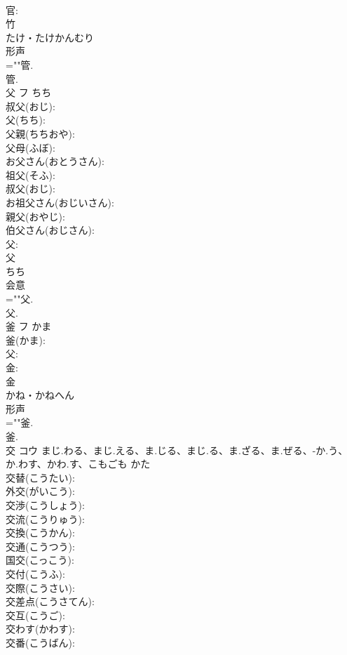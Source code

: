 \documentclass[8pt]{extreport}
\begin{document}
\begin{CJK}{UTF8}{min}
\\	官: 
\\	竹	
\\	たけ・たけかんむり	
\\	形声 
\\	=""管.
\\	管.
\\	父	フ	ちち		
\\	叔父(おじ): 
\\	父(ちち): 
\\	父親(ちちおや): 
\\	父母(ふぼ): 
\\	お父さん(おとうさん): 
\\	祖父(そふ): 
\\	叔父(おじ): 
\\	お祖父さん(おじいさん): 
\\	親父(おやじ): 
\\	伯父さん(おじさん): 
\\	父: 
\\	父	
\\	ちち	
\\	会意 
\\	=""父.
\\	父.
\\	釜	フ	かま		
\\	釜(かま): 
\\	父: 
\\	金: 
\\	金	
\\	かね・かねへん	
\\	形声 
\\	=""釜.
\\	釜.
\\	交	コウ	まじ.わる、まじ.える、ま.じる、まじ.る、ま.ざる、ま.ぜる、-か.う、か.わす、かわ.す、こもごも	かた	
\\	交替(こうたい): 
\\	外交(がいこう): 
\\	交渉(こうしょう): 
\\	交流(こうりゅう): 
\\	交換(こうかん): 
\\	交通(こうつう): 
\\	国交(こっこう): 
\\	交付(こうふ): 
\\	交際(こうさい): 
\\	交差点(こうさてん): 
\\	交互(こうご): 
\\	交わす(かわす): 
\\	交番(こうばん): 

\end{CJK}
\end{document}
